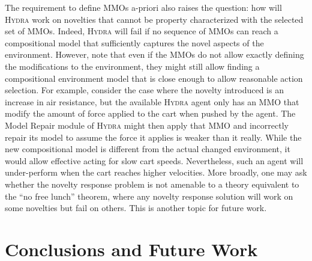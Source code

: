\documentclass[letterpaper]{article} %
\newcommand{\hydra}{\textsc{Hydra}\xspace} %
\begin{document}
The requirement to define MMOs a-priori also raises the question: how will \hydra work on novelties that cannot be property characterized with the selected set of MMOs. Indeed, \hydra will fail if no sequence of MMOs can reach a compositional model that sufficiently captures the novel aspects of the environment. However, note that even if the MMOs do not allow exactly defining the modifications to the environment, they might still allow finding a compositional environment model that is close enough to allow reasonable action selection. 
For example, consider the case where the novelty introduced is an increase in air resistance, but the available \hydra agent only has an MMO that modify the amount of force applied to the cart when pushed by the agent. The Model Repair module of \hydra might then apply that MMO and incorrectly repair its model to assume the force it applies is weaker than it really. While the new compositional model is different from the actual changed environment, it would allow effective acting for slow cart speeds. Nevertheless, such an agent will under-perform when the cart reaches higher velocities. 
More broadly, one may ask whether the novelty response problem is not amenable to a theory equivalent to the ``no free lunch'' theorem, where any novelty response solution will work on some novelties but fail on others. This is another topic for future work. 


\section{Conclusions and Future Work}
\todo[inline,color=green]
\end{document}

